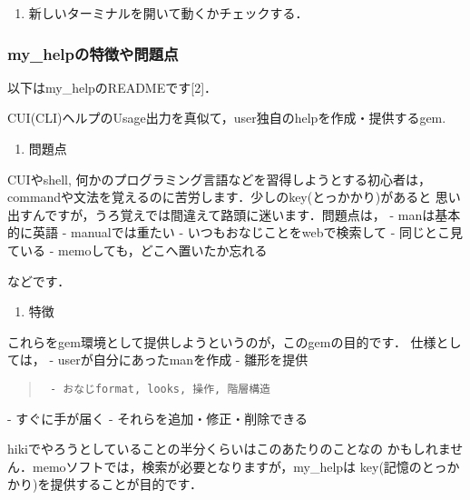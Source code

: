 \begin{enumerate}
\item 新しいターミナルを開いて動くかチェックする．
\end{enumerate}
\subsubsection{my\_helpの特徴や問題点}
以下はmy\_helpのREADMEです[2]．

CUI(CLI)ヘルプのUsage出力を真似て，user独自のhelpを作成・提供するgem.

\begin{enumerate}
\item 問題点
\end{enumerate}
CUIやshell, 何かのプログラミング言語などを習得しようとする初心者は，
commandや文法を覚えるのに苦労します．少しのkey(とっかかり)があると
思い出すんですが，うろ覚えでは間違えて路頭に迷います．問題点は，
- manは基本的に英語
- manualでは重たい
- いつもおなじことをwebで検索して
- 同じとこ見ている
- memoしても，どこへ置いたか忘れる

などです．

\begin{enumerate}
\item 特徴
\end{enumerate}
これらをgem環境として提供しようというのが，このgemの目的です．
仕様としては，
- userが自分にあったmanを作成
- 雛形を提供
\begin{quote}\begin{verbatim}
 - おなじformat, looks, 操作, 階層構造
\end{verbatim}\end{quote}
- すぐに手が届く
- それらを追加・修正・削除できる

hikiでやろうとしていることの半分くらいはこのあたりのことなの
かもしれません．memoソフトでは，検索が必要となりますが，my\_helpは
key(記憶のとっかかり)を提供することが目的です．

